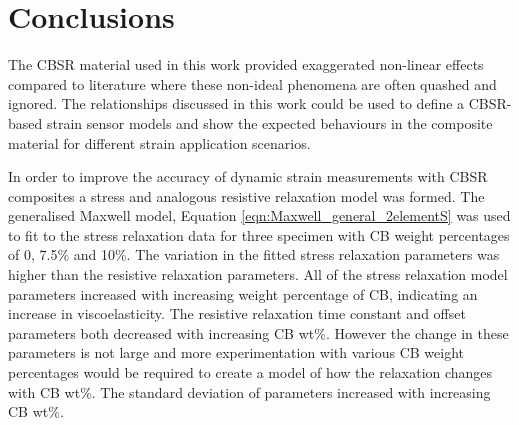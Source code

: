 
\section{Conclusions}
The CBSR material used in this work provided exaggerated non-linear effects compared to literature where these non-ideal phenomena are often quashed and ignored. The relationships discussed in this work could be used to define a CBSR-based strain sensor models and show the expected behaviours in the composite material for different strain application scenarios. 

In order to improve the accuracy of dynamic strain measurements with CBSR composites a stress and analogous resistive relaxation model was formed. The generalised Maxwell model, Equation \ref{eqn:Maxwell_general_2elementS} was used to fit to the stress relaxation data for three specimen with CB weight percentages of 0, 7.5\% and 10\%. The variation in the fitted stress relaxation parameters was higher than the resistive relaxation parameters. All of the stress relaxation model parameters increased with increasing weight percentage of CB, indicating an increase in viscoelasticity. The resistive relaxation time constant and offset parameters both decreased with increasing CB wt\%. However the change in these parameters is not large and more experimentation with various CB weight percentages would be required to create a model of how the relaxation changes with CB wt\%. The standard deviation of parameters increased with increasing CB wt\%.

